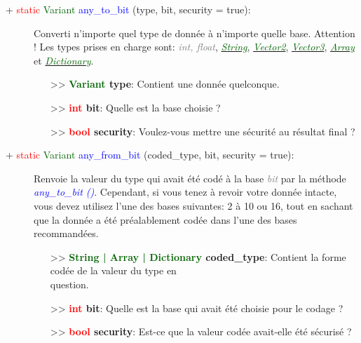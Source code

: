 \documentclass[a4paper, 11pt]{article}
\begin{document}
	\begin{description}
		\item [+ \textcolor{red}{static} \textcolor{darkgreen}{Variant} \textcolor{blue}{any\_to\_bit} 
		(type, bit, security = true):] Converti n'importe quel type de donnée à n'importe quelle base. 
		Attention ! Les types prises en charge sont: \textit{\textcolor{gray}{int, float}},
		\href{https://docs.godotengine.org/fr/stable/classes/class_string.html}
		{\textit{\textcolor{darkgreen}{String}}},
		\href{https://docs.godotengine.org/fr/stable/classes/class_vector2.html}
		{\textit{\textcolor{darkgreen}{Vector2}}},
		\href{https://docs.godotengine.org/fr/stable/classes/class_vector3.html}
		{\textit{\textcolor{darkgreen}{Vector3}}},
		\href{https://docs.godotengine.org/fr/stable/classes/class_array.html}
		{\textit{\textcolor{darkgreen}{Array}}} et
		\href{https://docs.godotengine.org/fr/stable/classes/class_dictionary.html}
		{\textit{\textcolor{darkgreen}{Dictionary}}}.
		\begin{itemize}
			\item [>> \textbf{\textcolor{darkgreen}{Variant} type}:] Contient une donnée quelconque.
			\item [>> \textbf{\textcolor{red}{int} bit}:] Quelle est la base choisie ?
			\item [>> \textbf{\textcolor{red}{bool} security}:] Voulez-vous mettre une sécurité au résultat 
			final ?\\
		\end{itemize}
	\end{description}
	\begin{description}
		\item [+ \textcolor{red}{static} \textcolor{darkgreen}{Variant} \textcolor{blue}{any\_from\_bit} 
		(coded\_type, bit, security = true):] Renvoie la valeur du type qui avait été codé à la base 
		\textit{\textcolor{gray}{bit}} par la méthode \textit{\textcolor{blue}{\textit{any\_to\_bit ()}}}.
		Cependant, si vous tenez à revoir votre donnée intacte, vous devez utilisez l'une des bases 
		suivantes: 2 à 10 ou 16, tout en sachant que la donnée a été préalablement codée dans l'une des 
		bases recommandées.
		\begin{itemize}
			\item [>> \textbf{\textcolor{darkgreen}{String | Array | Dictionary} coded\_type}:] Contient la 
			forme codée de la valeur du type en \\question.
			\item [>> \textbf{\textcolor{red}{int} bit}:] Quelle est la base qui avait été choisie pour le 
			codage ?
			\item [>> \textbf{\textcolor{red}{bool} security}:] Est-ce que la valeur codée avait-elle été 
			sécurisé ?\\
		\end{itemize}
	\end{description}
\end{document}
